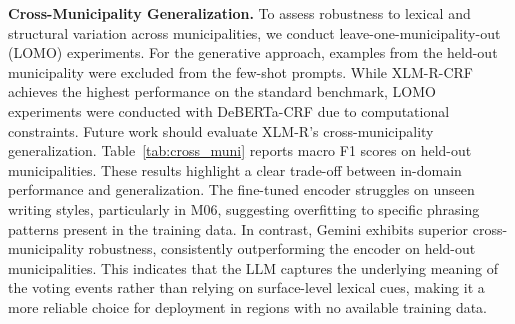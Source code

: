 \documentclass[11pt]{article}
\begin{document}

\noindent\textbf{Cross-Municipality Generalization.}
To assess robustness to lexical and structural variation across municipalities, we conduct leave-one-municipality-out (LOMO) experiments. For the generative approach, examples from the held-out municipality were excluded from the few-shot prompts. While XLM-R-CRF achieves the highest performance on the standard benchmark, LOMO experiments were conducted with DeBERTa-CRF due to computational constraints. Future work should evaluate XLM-R's cross-municipality generalization. Table~\ref{tab:cross_muni} reports macro F1 scores on held-out municipalities. These results highlight a clear trade-off between in-domain performance and generalization. The fine-tuned encoder struggles on unseen writing styles, particularly in M06, suggesting overfitting to specific phrasing patterns present in the training data. In contrast, Gemini exhibits superior cross-municipality robustness, consistently outperforming the encoder on held-out municipalities. This indicates that the LLM captures the underlying meaning of the voting events rather than relying on surface-level lexical cues, making it a more reliable choice for deployment in regions with no available training data.
\end{document}
